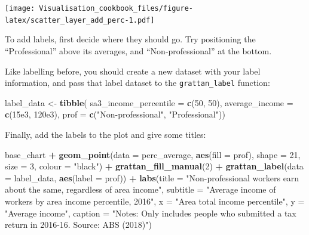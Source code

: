 \documentclass[]{book}
\newenvironment{Shaded}{\begin{snugshade}}{\end{snugshade}}
\newcommand{\DataTypeTok}[1]{\textcolor[rgb]{0.13,0.29,0.53}{#1}}
\newcommand{\DecValTok}[1]{\textcolor[rgb]{0.00,0.00,0.81}{#1}}
\newcommand{\FloatTok}[1]{\textcolor[rgb]{0.00,0.00,0.81}{#1}}
\newcommand{\KeywordTok}[1]{\textcolor[rgb]{0.13,0.29,0.53}{\textbf{#1}}}
\newcommand{\NormalTok}[1]{#1}
\newcommand{\OperatorTok}[1]{\textcolor[rgb]{0.81,0.36,0.00}{\textbf{#1}}}
\newcommand{\StringTok}[1]{\textcolor[rgb]{0.31,0.60,0.02}{#1}}
\begin{document}
\texttt{[image: Visualisation\_cookbook\_files/figure-latex/scatter\_layer\_add\_perc-1.pdf]}

To add labels, first decide where they should go. Try positioning the ``Professional'' above its averages, and ``Non-professional'' at the bottom.

Like labelling before, you should create a new dataset with your label information, and pass that label dataset to the \texttt{grattan\_label} function:

\begin{Shaded}
\begin{Highlighting}[]
\NormalTok{label_data <-}\StringTok{ }\KeywordTok{tibble}\NormalTok{(}
  \DataTypeTok{sa3_income_percentile =} \KeywordTok{c}\NormalTok{(}\DecValTok{50}\NormalTok{, }\DecValTok{50}\NormalTok{),}
  \DataTypeTok{average_income =} \KeywordTok{c}\NormalTok{(}\FloatTok{15e3}\NormalTok{, }\FloatTok{120e3}\NormalTok{),}
  \DataTypeTok{prof =}  \KeywordTok{c}\NormalTok{(}\StringTok{"Non-professional"}\NormalTok{, }\StringTok{"Professional"}\NormalTok{))}
\end{Highlighting}
\end{Shaded}

Finally, add the labels to the plot and give some titles:

\begin{Shaded}
\begin{Highlighting}[]
\NormalTok{base_chart }\OperatorTok{+}
\StringTok{  }\KeywordTok{geom_point}\NormalTok{(}\DataTypeTok{data =}\NormalTok{ perc_average,}
             \KeywordTok{aes}\NormalTok{(}\DataTypeTok{fill =}\NormalTok{ prof),}
             \DataTypeTok{shape =} \DecValTok{21}\NormalTok{,}
             \DataTypeTok{size =} \DecValTok{3}\NormalTok{, }
             \DataTypeTok{colour =} \StringTok{"black"}\NormalTok{) }\OperatorTok{+}\StringTok{ }
\StringTok{  }\KeywordTok{grattan_fill_manual}\NormalTok{(}\DecValTok{2}\NormalTok{) }\OperatorTok{+}\StringTok{ }
\StringTok{  }\KeywordTok{grattan_label}\NormalTok{(}\DataTypeTok{data =}\NormalTok{ label_data,}
                \KeywordTok{aes}\NormalTok{(}\DataTypeTok{label =}\NormalTok{ prof)) }\OperatorTok{+}\StringTok{ }
\StringTok{  }\KeywordTok{labs}\NormalTok{(}\DataTypeTok{title =} \StringTok{"Non-professional workers earn about the same, regardless of area income"}\NormalTok{,}
       \DataTypeTok{subtitle =} \StringTok{"Average income of workers by area income percentile, 2016"}\NormalTok{,}
       \DataTypeTok{x =} \StringTok{"Area total income percentile"}\NormalTok{,}
       \DataTypeTok{y =} \StringTok{"Average income"}\NormalTok{,}
       \DataTypeTok{caption =} \StringTok{"Notes: Only includes people who submitted a tax return in 2016-16. Source: ABS (2018)"}\NormalTok{)}
\end{Highlighting}
\end{Shaded}
\end{document}
